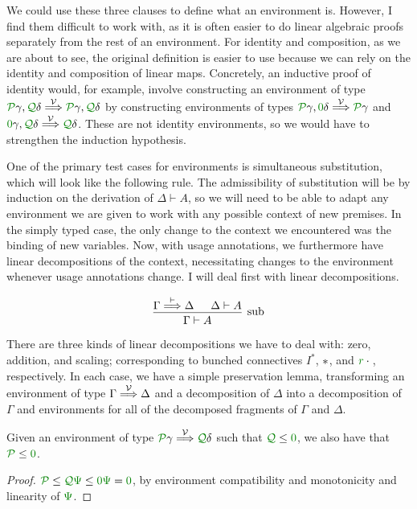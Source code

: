 We could use these three clauses to define what an environment is.
However, I find them difficult to work with, as it is often easier to do
linear algebraic proofs separately from the rest of an environment.
For identity and composition, as we are about to see, the original definition
is easier to use because we can rely on the identity and composition of linear
maps.
Concretely, an inductive proof of identity would, for example, involve
constructing an environment of type
$\grP\gamma, \grQ\delta \env\V \grP\gamma, \grQ\delta$ by constructing
environments of types $\grP\gamma, \gr0\delta \env\V \grP\gamma$ and
$\gr0\gamma, \grQ\delta \env\V \grQ\delta$.
These are not identity environments, so we would have to strengthen the
induction hypothesis.

One of the primary test cases for environments is simultaneous substitution,
which will look like the following rule.
The admissibility of substitution will be by induction on the derivation of
$\Delta \vdash A$, so we will need to be able to adapt any environment we are
given to work with any possible context of new premises.
In the simply typed case, the only change to the context we encountered was the
binding of new variables.
Now, with usage annotations, we furthermore have linear decompositions of the
context, necessitating changes to the environment whenever usage annotations
change.
I will deal first with linear decompositions.

\begin{displaymath}
  \begin{prooftree}
    \hypo{\Gamma \env{\vdash} \Delta}
    \hypo{\Delta \vdash A}
    \infer2[sub]{\Gamma \vdash A}
  \end{prooftree}
\end{displaymath}

There are three kinds of linear decompositions we have to deal with: zero,
addition, and scaling; corresponding to bunched connectives $I^*$, $\mathbin{*}$, and
$\gr r \cdot {}$, respectively.
In each case, we have a simple preservation lemma, transforming an environment
of type $\Gamma \stackrel{\mathcal V}\Longrightarrow \Delta$ and a decomposition of $\Delta$ into a
decomposition of $\Gamma$ and environments for all of the decomposed fragments
of $\Gamma$ and $\Delta$.

\begin{lemma}\label{thm:lr-env-zero}
  Given an environment of type $\grP\gamma \env\V \grQ\delta$ such that
  $\grQ \leq \gr 0$, we also have that $\grP \leq \gr 0$.
\end{lemma}
\begin{proof}
  $\grP \leq \grQ\gr\Psi \leq \gr0\gr\Psi = \gr0$, by environment
  compatibility and monotonicity and linearity of $\gr\Psi$.
\end{proof}

